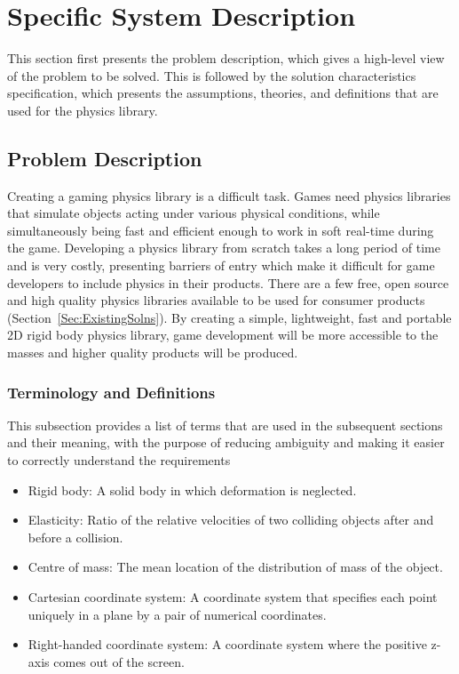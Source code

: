 \documentclass[12pt]{article}
\begin{document}
\section{Specific System Description}
\label{Sec:SpecSystDesc}
This section first presents the problem description, which gives a high-level view of the problem to be solved. This is followed by the solution characteristics specification, which presents the assumptions, theories, and definitions that are used for the physics library.
\subsection{Problem Description}
\label{Sec:ProbDesc}
Creating a gaming physics library is a difficult task. Games need physics libraries that simulate objects acting under various physical conditions, while simultaneously being fast and efficient enough to work in soft real-time during the game. Developing a physics library from scratch takes a long period of time and is very costly, presenting barriers of entry which make it difficult for game developers to include physics in their products. There are a few free, open source and high quality physics libraries available to be used for consumer products (Section~\ref{Sec:ExistingSolns}). By creating a simple, lightweight, fast and portable 2D rigid body physics library, game development will be more accessible to the masses and higher quality products will be produced.
\subsubsection{Terminology and Definitions}
\label{Sec:TermDefs}
This subsection provides a list of terms that are used in the subsequent sections and their meaning, with the purpose of reducing ambiguity and making it easier to correctly understand the requirements
\begin{itemize}
\item{Rigid body: A solid body in which deformation is neglected.}
\item{Elasticity: Ratio of the relative velocities of two colliding objects after and before a collision.}
\item{Centre of mass: The mean location of the distribution of mass of the object.}
\item{Cartesian coordinate system: A coordinate system that specifies each point uniquely in a plane by a pair of numerical coordinates.}
\item{Right-handed coordinate system: A coordinate system where the positive z-axis comes out of the screen.}
\end{itemize}
\end{document}
